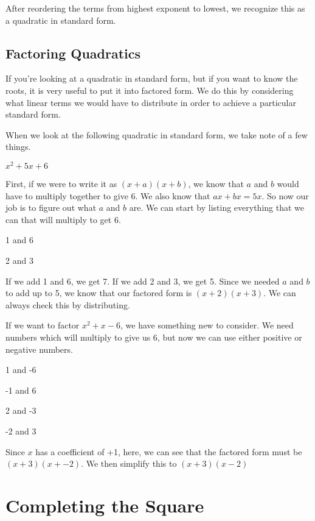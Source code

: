 After reordering the terms from highest exponent to lowest, we recognize this as a quadratic in standard form.

\subsection*{Factoring Quadratics}

If you're looking at a quadratic in standard form, but if you want to know the roots, it is very useful to put it into factored form.  We do this by considering what linear terms we would have to distribute in order to achieve a particular standard form.

\begin{example}

When we look at the following quadratic in standard form, we take note of a few things.

$x^2 + 5x + 6$

First, if we were to write it as $(x + a)(x + b)$, we know that $a$ and $b$ would have to multiply together to give 6.  We also know that $ax + bx = 5x$.  So now our job is to figure out what $a$ and $b$ are.  We can start by listing everything that we can that will multiply to get 6.

1 and 6

2 and 3

If we add 1 and 6, we get 7.  If we add 2 and 3, we get 5.  Since we needed $a$ and $b$ to add up to 5, we know that our factored form is $(x + 2)(x + 3)$.  We can always check this by distributing. 

\end{example}

\begin{example}

If we want to factor $x^2 +x - 6$, we have something new to consider.  We need numbers which will multiply to give us 6, but now we can use either positive or negative numbers.

1 and -6

-1 and 6

2 and -3

-2 and 3

Since $x$ has a coefficient of +1, here, we can see that the factored form must be $(x+3)(x + -2)$.  We then simplify this to $(x+3)(x - 2)$

\end{example}

\section*{Completing the Square}

